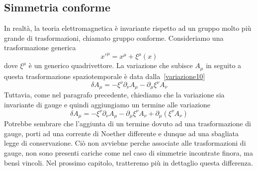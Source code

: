 \subsection{Simmetria conforme}
    In realtà, la teoria elettromagnetica è invariante rispetto ad un gruppo molto più grande di trasformazioni, chiamato gruppo conforme. Consideriamo una trasformazione generica
\begin{equation*}
    x'^\mu = x^\mu + \xi^\mu(x)
\end{equation*}
    dove $\xi^\mu$ è un generico quadrivettore. La variazione che subisce $A_\mu$ in seguito a questa trasformazione spaziotemporale è data dalla~\eqref{variazione10}
\begin{equation*}
    \delta A_\mu = - \xi^\nu \partial_\nu A_\mu - \partial_\mu \xi^\nu A_\nu
\end{equation*}
    Tuttavia, come nel paragrafo precedente, chiediamo che la variazione sia invariante di gauge e quindi aggiungiamo un termine alle variazione
\begin{equation*}
    \delta A_\mu = - \xi^\nu \partial_\nu A_\mu - \partial_\mu \xi^\nu A_\nu + \partial_\mu(\xi^\nu A_\nu)
\end{equation*}
    Potrebbe sembrare che l'aggiunta di un termine dovuto ad una trasformazione di gauge, porti ad una corrente di Noether differente e dunque ad una sbagliata legge di conservazione. Ciò non avviebne perche associate alle trasformazioni di gauge, non sono presenti cariche come nel caso di simmetrie incontrate finora, ma bensì vincoli. Nel prossimo capitolo, tratteremo più in dettaglio questa differenza. 

